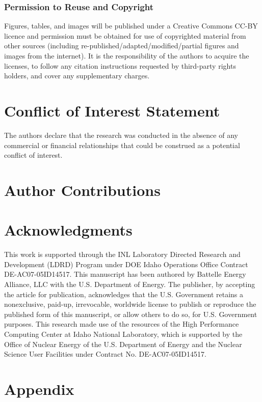 \documentclass[utf8]{frontiersSCNS} %
\providecommand{\DIFaddtex}[1]{{\bf #1}} %
\providecommand{\DIFaddbegin}{\protect\color{blue}} %
\providecommand{\DIFadd}[1]{\texorpdfstring{\DIFaddtex{#1}}{#1}} %
\begin{document}
\subsubsection{Permission to Reuse and Copyright}
Figures, tables, and images will be published under a Creative Commons CC-BY licence and permission must be obtained for use of copyrighted material from other sources (including re-published/adapted/modified/partial figures and images from the internet). It is the responsibility of the authors to acquire the licenses, to follow any citation instructions requested by third-party rights holders, and cover any supplementary charges.

\section*{Conflict of Interest Statement}

The authors declare that the research was conducted in the absence of any commercial or financial relationships that could be construed as a potential conflict of interest.

\section*{Author Contributions}


\section*{Acknowledgments}
This work is supported through the INL Laboratory Directed Research and Development (LDRD) Program under DOE Idaho Operations Office Contract DE-AC07-05ID14517. This manuscript has been authored by Battelle Energy Alliance, LLC with the U.S. Department of Energy. The publisher, by accepting the article for publication, acknowledges that the U.S. Government retains a nonexclusive, paid-up, irrevocable, worldwide license to publish or reproduce the published form of this manuscript, or allow others to do so, for U.S. Government purposes. This research made use of the resources of the High Performance Computing Center at Idaho National Laboratory, which is supported by the Office of Nuclear Energy of the U.S. Department of Energy and the Nuclear Science User Facilities under Contract No. DE-AC07-05ID14517. 
\DIFaddbegin 

\section{\DIFadd{Appendix}}
\end{document}
